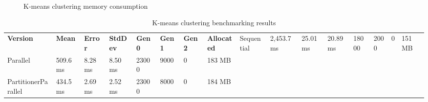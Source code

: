 \begin{figure}[!ht]
\centering
{}
\caption{K-means clustering memory consumption}
\label{fig: KMeansMemory}
\end{figure}

\begin{sidewaystable}[!ht]
    \centering
    \caption{K-means clustering benchmarking results}
		\label{tab: KMeansBenchmarking}
    \begin{tabular}{lp{3cm}p{1.5cm}p{1.5cm}p{2cm}p{2cm}p{2cm}p{2cm}}
			\toprule
			\bfseries Version 	&
			\bfseries Mean    	&
			\bfseries Error	    &
			\bfseries StdDev	  &
			\bfseries Gen 0	    &
			\bfseries Gen 1	    &
			\bfseries Gen 2	    &
			\bfseries Allocated &
			\midrule 
Sequential & 2,453.7 ms	& 25.01ms	& 20.89ms	& 18000 & 	2000 & 	0 & 151 MB \\
Parallel & 509.6 ms	& 8.28 ms	& 8.50 ms	& 23000 & 	9000 & 	0 & 183 MB \\ 
PartitionerParallel & 434.5 ms	& 2.69 ms	& 2.52 ms	& 23000 & 	8000 & 	0 & 184 MB \\
			\bottomrule
    \end{tabular}
\end{sidewaystable}